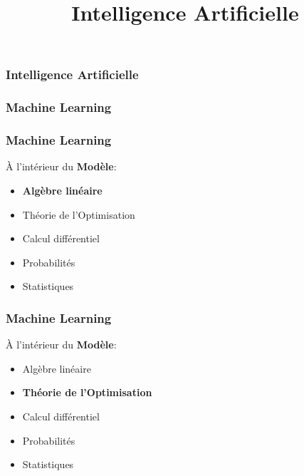 \documentclass{formation}
\title{Intelligence Artificielle}
\begin{document}
\maketitle

\begin{frame}
  \frametitle{Intelligence Artificielle}
\end{frame}

\begin{frame}
  \frametitle{Machine Learning}
\end{frame}

\begin{frame}
  \frametitle{Machine Learning}
  \begin{minipage}[c]{0.41\linewidth}
    À l'intérieur du \textbf{Modèle}:
    \begin{itemize}
    \item \textbf{Algèbre linéaire}
    \item Théorie de l'Optimisation
    \item Calcul différentiel
    \item Probabilités
    \item Statistiques
    \end{itemize}
  \end{minipage}\hfill
  \begin{minipage}[c]{0.58\linewidth}
  \end{minipage}\hfill
\end{frame}

\begin{frame}
  \frametitle{Machine Learning}
  \begin{minipage}[c]{0.45\linewidth}
    À l'intérieur du \textbf{Modèle}:
    \begin{itemize}
    \item Algèbre linéaire
    \item \textbf{Théorie de l'Optimisation}
    \item Calcul différentiel
    \item Probabilités
    \item Statistiques
    \end{itemize}
  \end{minipage}\hfill
  \begin{minipage}[c]{0.55\linewidth}
  \end{minipage}\hfill
\end{frame}
\end{document}
